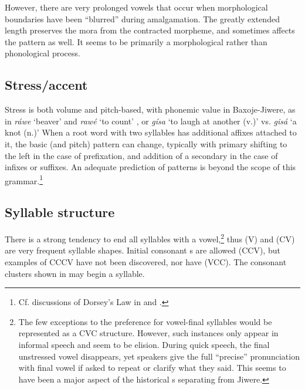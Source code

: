 \documentclass[output=paper]{LSP/langsci}
\begin{document}
However, there are very prolonged vowels that occur when morphological boundaries have been ``blurred'' during amalgamation.  The greatly extended length preserves the mora from the contracted morpheme, and sometimes affects the  pattern as well.  It seems to be primarily a morphological rather than phonological process.  

\subsection{Stress/accent} 
Stress is both volume and pitch-based, with phonemic value in Baxoje-Jiwere, as in \textit{ráwe} `beaver' and \textit{rawé} `to count' \citep{GoodtracksND}, or \textit{gísa} `to laugh at another (v.)' vs. \textit{gisá}  `a knot (n.)'  \citep{DorseyNDChiwere}   When a root word with two syllables has additional affixes attached to it, the basic  (and pitch) pattern can change, typically with primary  shifting to the left in the case of prefixation, and addition of a secondary  in the case of infixes or suffixes.  An adequate prediction of  patterns is beyond the scope of this grammar.\footnote{Cf. discussions of Dorsey's Law in \citet{Miner1979b} and \citet{HaleWhiteEagle1980}.} 

\subsection{Syllable structure} 
There is a strong tendency to end all syllables with a vowel,\footnote{The few exceptions to the preference for vowel-final syllables would be represented as a CVC structure. However, such instances only appear in informal speech and seem to be elision. During quick speech, the final unstressed vowel disappears, yet speakers give the full ``precise'' pronunciation with final vowel if asked to repeat or clarify what they said. This seems to have been a major aspect of the historical s separating  from Jiwere.} thus (V) and (CV) are very frequent syllable shapes. Initial consonant s are allowed (CCV), but examples of CCCV have not been discovered, nor have (VCC).  The consonant clusters shown in  may begin a syllable. 
\end{document}
